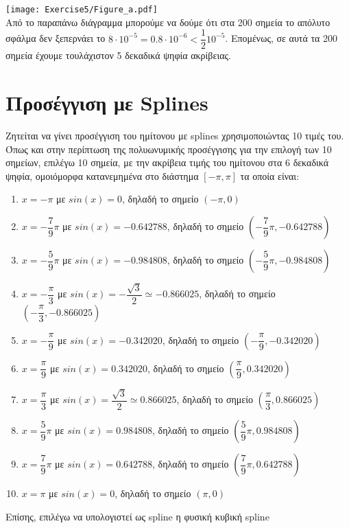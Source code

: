 \documentclass[a4paper,11pt]{article}
\newcommand{\lt}{\latintext}
\begin{document}
\texttt{[image: Exercise5/Figure\_a.pdf]}\\
Από το παραπάνω διάγραμμα μπορούμε να δούμε ότι στα 200 σημεία το απόλυτο σφάλμα δεν ξεπερνάει το $8\cdot 10^{-5} = 0.8\cdot 10^{-6} < \dfrac{1}{2}10^{-5}$. Επομένως, σε αυτά τα 200 σημεία έχουμε τουλάχιστον 5 δεκαδικά ψηφία ακρίβειας.

\section{Προσέγγιση με {\lt Splines}}
Ζητείται να γίνει προσέγγιση του ημίτονου με {\lt splines} χρησιμοποιώντας 10 τιμές του. Όπως και στην περίπτωση της πολυωνυμικής προσέγγισης για την επιλογή των 10 σημείων, επιλέγω 10 σημεία, με την ακρίβεια τιμής του ημίτονου στα 6 δεκαδικά ψηφία, ομοιόμορφα κατανεμημένα στο διάστημα $[-\pi, \pi]$ τα οποία είναι:
\begin{enumerate}
    \item {\lt $x = -\pi$} με {\lt $sin(x) = 0$}, δηλαδή το σημείο $(-\pi, 0)$
    \item {\lt $x = -\dfrac{7}{9}\pi$} με {\lt $sin(x) = -0.642788$}, δηλαδή το σημείο $(-\dfrac{7}{9}\pi, -0.642788)$
    \item {\lt $x = -\dfrac{5}{9}\pi$} με {\lt $sin(x) = -0.984808$}, δηλαδή το σημείο $(-\dfrac{5}{9}\pi, -0.984808)$
    \item {\lt $x = -\dfrac{\pi}{3}$} με {\lt $sin(x) = -\dfrac{\sqrt{3}}{2} \simeq -0.866025$}, δηλαδή το σημείο $(-\dfrac{\pi}{3}, -0.866025)$
    \item {\lt $x = -\dfrac{\pi}{9}$} με {\lt $sin(x) = -0.342020$}, δηλαδή το σημείο $(-\dfrac{\pi}{9}, -0.342020)$
    \item {\lt $x = \dfrac{\pi}{9}$} με {\lt $sin(x) = 0.342020$}, δηλαδή το σημείο $(\dfrac{\pi}{9}, 0.342020)$
    \item {\lt $x = \dfrac{\pi}{3}$} με {\lt $sin(x) = \dfrac{\sqrt{3}}{2} \simeq 0.866025$}, δηλαδή το σημείο $(\dfrac{\pi}{3}, 0.866025)$
    \item {\lt $x = \dfrac{5}{9}\pi$} με {\lt $sin(x) = 0.984808$}, δηλαδή το σημείο $(\dfrac{5}{9}\pi, 0.984808)$
    \item {\lt $x = \dfrac{7}{9}\pi$} με {\lt $sin(x) = 0.642788$}, δηλαδή το σημείο $(\dfrac{7}{9}\pi, 0.642788)$
    \item {\lt $x = \pi$} με {\lt $sin(x) = 0$}, δηλαδή το σημείο $(\pi, 0)$
\end{enumerate}
Επίσης, επιλέγω να υπολογιστεί ως {\lt spline} η φυσική κυβική {\lt spline}
\end{document}
